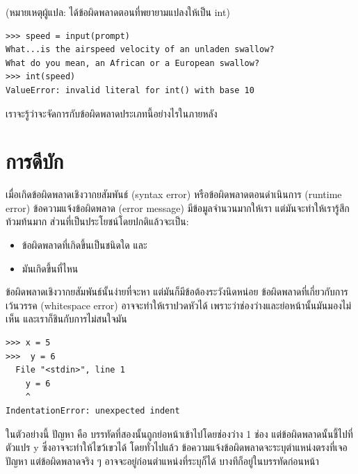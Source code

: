 (หมายเหตุผู้แปล: ได้ข้อผิดพลาดตอนที่พยายามแปลงให้เป็น int)

\begin{verbatim}
>>> speed = input(prompt)
What...is the airspeed velocity of an unladen swallow?
What do you mean, an African or a European swallow?
>>> int(speed)
ValueError: invalid literal for int() with base 10
\end{verbatim}
%
เราจะรู้ว่าจะจัดการกับข้อผิดพลาดประเภทนี้อย่างไรในภายหลัง


\section{การดีบัก}
\label{whitespace}

เมื่อเกิดข้อผิดพลาดเชิงวากยสัมพันธ์ (syntax error) หรือข้อผิดพลาดตอนดำเนินการ (runtime error)
ข้อความแจ้งข้อผิดพลาด (error message) มีข้อมูลจำนวนมากให้เรา แต่มันจะทำให้เรารู้สึกท้วมท้นมาก 
ส่วนที่เป็นประโยชน์โดยปกติแล้วจะเป็น:

\begin{itemize}

\item ข้อผิดพลาดที่เกิดขึ้นเป็นชนิดใด และ

\item มันเกิดขึ้นที่ไหน

\end{itemize}

ข้อผิดพลาดเชิงวากยสัมพันธ์นั้นง่ายที่จะหา แต่มันก็มีข้อต้องระวังนิดหน่อย 
ข้อผิดพลาดที่เกี่ยวกับการเว้นวรรค (whitespace error) อาจจะทำให้เราปวดหัวได้ 
เพราะว่าช่องว่างและย่อหน้านั้นมันมองไม่เห็น และเราก็ชินกับการไม่สนใจมัน

\begin{verbatim}
>>> x = 5
>>>  y = 6
  File "<stdin>", line 1
    y = 6
    ^
IndentationError: unexpected indent
\end{verbatim}
%
ในตัวอย่างนี้ ปัญหา คือ บรรทัดที่สองนั้นถูกย่อหน้าเข้าไปโดยช่องว่าง 1 ช่อง
แต่ข้อผิดพลาดนั้นชี้ไปที่ตัวแปร y ซึ่งอาจจะทำให้ไขว้เขวได้
โดยทั่วไปแล้ว ข้อความแจ้งข้อผิดพลาดจะระบุตำแหน่งตรงที่เจอปัญหา แต่ข้อผิดพลาดจริง ๆ 
อาจจะอยู่ก่อนตำแหน่งที่ระบุก็ได้ บางทีก็อยู่ในบรรทัดก่อนหน้า 

